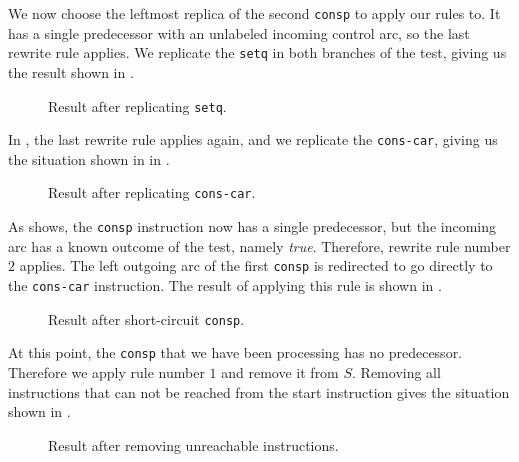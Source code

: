 We now choose the leftmost replica of the second \texttt{consp} to
apply our rules to.  It has a single predecessor with an unlabeled
incoming control arc, so the last rewrite rule applies.  We replicate
the \texttt{setq} in both branches of the test, giving us the result
shown in .

\begin{figure}
\begin{center}
\end{center}
\caption{\label{fig-rewrite-4}
Result after replicating \texttt{setq}.}
\end{figure}

In , the last rewrite rule applies again, and we
replicate the \texttt{cons-car}, giving us the situation shown in in
.

\begin{figure}
\begin{center}
\end{center}
\caption{\label{fig-rewrite-5}
Result after replicating \texttt{cons-car}.}
\end{figure}

As  shows, the \texttt{consp} instruction now
has a single predecessor, but the incoming arc has a known outcome of
the test, namely \textit{true}.  Therefore, rewrite rule number $2$
applies.  The left outgoing arc of the first \texttt{consp} is
redirected to go directly to the \texttt{cons-car} instruction.  The
result of applying this rule is shown in .

\begin{figure}
\begin{center}
\end{center}
\caption{\label{fig-rewrite-6}
Result after short-circuit \texttt{consp}.}
\end{figure}

At this point, the \texttt{consp} that we have been processing has no
predecessor.  Therefore we apply rule number $1$ and remove it from
$S$.  Removing all instructions that can not be reached from the start
instruction gives the situation shown in .

\begin{figure}
\begin{center}
\end{center}
\caption{\label{fig-rewrite-7}
Result after removing unreachable instructions.}
\end{figure}

